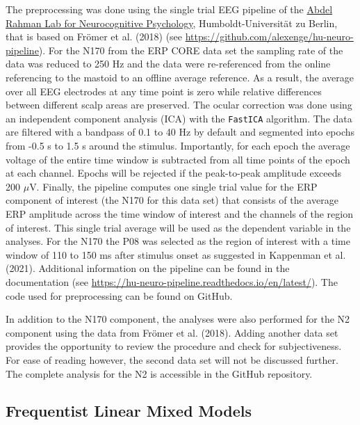 \documentclass[
  doc,12pt,floatsintext]{apa7}
\begin{document}
The preprocessing was done using the single trial EEG pipeline of the \href{https://abdelrahmanlab.com/}{Abdel Rahman Lab for Neurocognitive Psychology}, Humboldt-Universität zu Berlin, that is based on Frömer et al. (2018) (see \url{https://github.com/alexenge/hu-neuro-pipeline}). For the N170 from the ERP CORE data set the sampling rate of the data was reduced to 250 Hz and the data were re-referenced from the online referencing to the mastoid to an offline average reference. As a result, the average over all EEG electrodes at any time point is zero while relative differences between different scalp areas are preserved. The ocular correction was done using an independent component analysis (ICA) with the \texttt{FastICA} algorithm. The data are filtered with a bandpass of 0.1 to 40 Hz by default and segmented into epochs from -0.5 s to 1.5 s around the stimulus. Importantly, for each epoch the average voltage of the entire time window is subtracted from all time points of the epoch at each channel. Epochs will be rejected if the peak-to-peak amplitude exceeds 200 \(\mu\)V. Finally, the pipeline computes one single trial value for the ERP component of interest (the N170 for this data set) that consists of the average ERP amplitude across the time window of interest and the channels of the region of interest. This single trial average will be used as the dependent variable in the analyses. For the N170 the P08 was selected as the region of interest with a time window of 110 to 150 ms after stimulus onset as suggested in Kappenman et al. (2021). Additional information on the pipeline can be found in the documentation (see \url{https://hu-neuro-pipeline.readthedocs.io/en/latest/}). The code used for preprocessing can be found on GitHub.

In addition to the N170 component, the analyses were also performed for the N2 component using the data from Frömer et al. (2018). Adding another data set provides the opportunity to review the procedure and check for subjectiveness. For ease of reading however, the second data set will not be discussed further. The complete analysis for the N2 is accessible in the GitHub repository.

\subsection{Frequentist Linear Mixed Models}\label{frequentist-linear-mixed-models}
\end{document}
